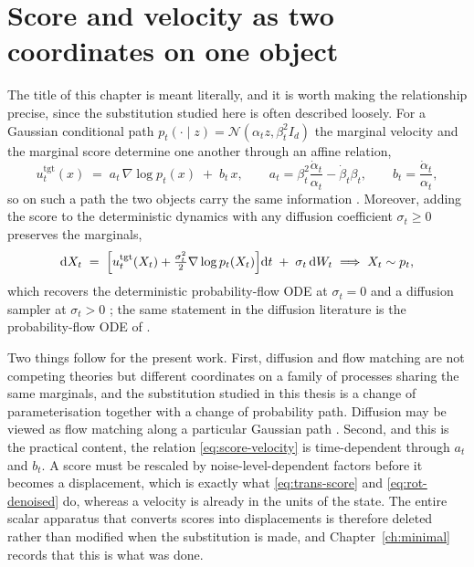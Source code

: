 \documentclass[11pt,a4paper]{report}
\theoremstyle{plain}
\theoremstyle{definition}
\theoremstyle{remark}
\newcommand{\dif}{\mathrm{d}}
\newcommand{\vfield}{u}
\begin{document}
\section{Score and velocity as two coordinates on one object}
\label{sec:score-vs-velocity}

The title of this chapter is meant literally, and it is worth making the
relationship precise, since the substitution studied here is often described
loosely. For a Gaussian conditional path
$p_t(\cdot\mid z) = \mathcal{N}(\alpha_t z, \beta_t^{2} I_d)$ the marginal
velocity and the marginal score determine one another through an affine
relation,
\begin{equation}
  \vfield_t^{\mathrm{tgt}}(x)
  \;=\; a_t\, \nabla \log p_t(x) \;+\; b_t\, x,
  \qquad
  a_t = \beta_t^{2}\frac{\dot\alpha_t}{\alpha_t} - \dot\beta_t \beta_t,
  \qquad
  b_t = \frac{\dot\alpha_t}{\alpha_t},
  \label{eq:score-velocity}
\end{equation}
so on such a path the two objects carry the same information
\citep[Proposition~1]{holderrieth2025flowmatching}. Moreover, adding the score
to the deterministic dynamics with any diffusion coefficient $\sigma_t \ge 0$
preserves the marginals,
\begin{equation}
  \dif X_t \;=\; \Bigl[\vfield_t^{\mathrm{tgt}}(X_t)
    + \tfrac{\sigma_t^{2}}{2}\nabla \log p_t(X_t)\Bigr]\dif t
    \;+\; \sigma_t\, \dif W_t
  \;\Longrightarrow\; X_t \sim p_t ,
  \label{eq:sde-family}
\end{equation}
which recovers the deterministic probability-flow ODE at $\sigma_t = 0$ and a
diffusion sampler at $\sigma_t > 0$
\citep[Theorem~17]{holderrieth2025flowmatching}; the same statement in the
diffusion literature is the probability-flow ODE of \citet{song2021sde}.

Two things follow for the present work. First, diffusion and flow matching are
not competing theories but different coordinates on a family of processes
sharing the same marginals, and the substitution studied in this thesis is a
change of parameterisation together with a change of probability path.
Diffusion may be viewed as flow matching along a particular Gaussian path
\citep{lipman2023flow}. Second, and this is the practical content, the
relation \eqref{eq:score-velocity} is time-dependent through $a_t$ and $b_t$.
A score must be rescaled by noise-level-dependent factors before it becomes a
displacement, which is exactly what \eqref{eq:trans-score} and
\eqref{eq:rot-denoised} do, whereas a velocity is already in the units of the
state. The entire scalar apparatus that converts scores into displacements is
therefore deleted rather than modified when the substitution is made, and
Chapter~\ref{ch:minimal} records that this is what was done.
\end{document}
